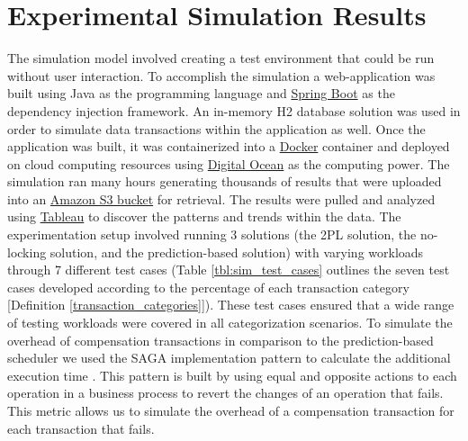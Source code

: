\section{Experimental Simulation Results}
\label{pbs:experimentation}
The simulation model involved creating a test environment that could be run without user interaction. To accomplish the simulation a web-application was built using Java as the programming language and \href{https://spring.io/projects/spring-boot}{Spring Boot} as the dependency injection framework. An in-memory H2 database solution was used in order to simulate data transactions within the application as well. Once the application was built, it was containerized into a \href{https://www.docker.com/}{Docker} container and deployed on cloud computing resources using \href{https://www.digitalocean.com/}{Digital Ocean} as the computing power. The simulation ran many hours generating thousands of results that were uploaded into an \href{https://aws.amazon.com/s3/}{Amazon S3 bucket} for retrieval. The results were pulled and analyzed using \href{https://www.tableau.com/}{Tableau} to discover the patterns and trends within the data. The experimentation setup involved running 3 solutions (the \ac{2PL} solution, the no-locking solution, and the prediction-based solution) with varying workloads through 7 different test cases (Table \ref{tbl:sim_test_cases} outlines the seven test cases developed according to the percentage of each transaction category [Definition \ref{transaction_categories}]). These test cases ensured that a wide range of testing workloads were covered in all categorization scenarios. To simulate the overhead of compensation transactions in comparison to the prediction-based scheduler we used the SAGA implementation pattern to calculate the additional execution time \cite{SAGAS-Garcaa-Molrna}. This pattern is built by using equal and opposite actions to each operation in a business process to revert the changes of an operation that fails. This metric allows us to simulate the overhead of a compensation transaction for each transaction that fails.

